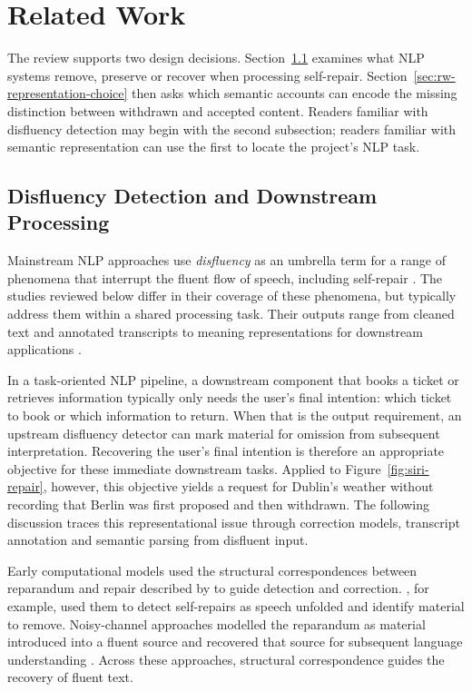 \section{Related Work}
\label{sec:related-work}

The review supports two design decisions. Section~\ref{sec:rw-disfluency}
examines what NLP systems remove, preserve or recover when processing
self-repair. Section~\ref{sec:rw-representation-choice} then asks which
semantic accounts can encode the missing distinction between withdrawn and
accepted content. Readers familiar with disfluency detection may begin with
the second subsection; readers familiar with semantic representation can use
the first to locate the project's NLP task.

\subsection{Disfluency Detection and Downstream Processing}
\label{sec:rw-disfluency}

Mainstream NLP approaches use \emph{disfluency} as an umbrella term for a
range of phenomena that interrupt the fluent flow of speech, including
self-repair
\citep{shribergPreliminariesTheorySpeech1994,senSemanticParsingDisfluent2021}.
The studies reviewed below differ in their coverage of these phenomena, but
typically address them within a shared processing task. Their outputs range
from cleaned text and annotated transcripts to meaning representations for
downstream applications
\citep{johnsonTAGbasedNoisychannelModel2004,futamiStreamingJointSpeech2023,senSemanticParsingDisfluent2021}.

In a task-oriented NLP pipeline, a downstream component that books a ticket
or retrieves information typically only needs the user's final intention: which
ticket to book or which information to return. When that is the output
requirement, an upstream disfluency detector can mark material for omission
from subsequent interpretation. Recovering the user's
final intention is therefore an appropriate objective for these immediate
downstream tasks. Applied to Figure~\ref{fig:siri-repair}, however, this
objective yields a request for Dublin's weather without recording that Berlin
was first proposed and then withdrawn. The following discussion traces this
representational issue through correction models, transcript annotation and
semantic parsing from disfluent input.

Early computational models used the structural correspondences between
reparandum and repair described by \citet{leveltMonitoringSelfrepairSpeech1983}
to guide detection and correction. \citet{heemanDetectingCorrectingSpeech1994},
for example, used them to detect self-repairs as speech unfolded and identify
material to remove. Noisy-channel approaches modelled the reparandum as
material introduced into a fluent source and recovered that source for
subsequent language understanding
\citep{johnsonTAGbasedNoisychannelModel2004,honalCorrectionDisfluenciesSpontaneous2003}.
Across these approaches, structural correspondence guides the recovery of
fluent text.

